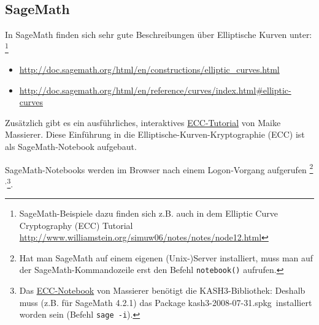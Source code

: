 \begin{refsegment}
\subsection{SageMath}
\label{ec:Sage_Massierer}

In SageMath finden sich sehr gute Beschreibungen über Elliptische Kurven unter:%
\footnote{%
SageMath-Beispiele dazu finden sich z.B. auch in
  dem \glqq Elliptic Curve Cryptography (ECC) Tutorial\grqq\\
  \url{http://www.williamstein.org/simuw06/notes/notes/node12.html}
}

\begin{sloppypar} %
\begin{itemize}
    \item \url{http://doc.sagemath.org/html/en/constructions/elliptic_curves.html}
    \item \url{http://doc.sagemath.org/html/en/reference/curves/index.html#elliptic-curves}
\end{itemize}
\end{sloppypar}


Zusätzlich gibt es ein ausführliches, interaktives
\hyperlink{ec:Web-Link:Sage_Massierer}{ECC-Tutorial} von Maike Massierer.
Diese Einführung in die Elliptische-Kurven-Kryptographie (ECC)
ist als SageMath-Notebook aufgebaut.

SageMath-Notebooks werden im Browser nach einem Logon-Vorgang aufgerufen%
\footnote{%
Hat man SageMath auf einem eigenen (Unix-)Server installiert, muss
man auf der SageMath-Kommandozeile erst den Befehl \verb#notebook()# aufrufen.
}${}^,$\footnote{%
Das \hyperlink{ec:Web-Link:Sage_Massierer}{ECC-Notebook} von Massierer
benötigt die KASH3-Bibliothek: Deshalb muss (z.B. für SageMath 4.2.1)%
das Package \glqq kash3-2008-07-31.spkg\grqq~installiert
worden sein (Befehl \verb#sage -i#).
}.



\end{refsegment}
